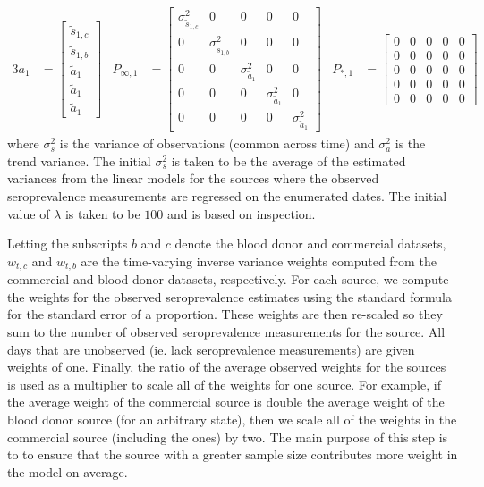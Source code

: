 \documentclass{article}
\begin{document}
\begin{alignat*}{3}
a_1 &= \begin{bmatrix}
\tilde{s}_{1,c}\\ 
\tilde{s}_{1,b}\\ 
\tilde{a}_1\\ 
\tilde{a}_1 \\
\tilde{a}_1
\end{bmatrix} & 
P_{\infty, 1} &= \begin{bmatrix}
\sigma^2_{\tilde{s}_{1,c}} & 0 & 0 & 0 & 0\\ 
0 & \sigma^2_{\tilde{s}_{1,b}} & 0 & 0 & 0\\ 
0 & 0 & \sigma^2_{\tilde{a}_1} & 0 & 0\\ 
0 & 0 & 0 & \sigma^2_{\tilde{a}_1} & 0 \\ 
0 & 0 & 0 & 0 & \sigma^2_{\tilde{a}_1}
\end{bmatrix} &  
P_{*, 1} &= \begin{bmatrix}
0 & 0 & 0 & 0 & 0\\ 
0 & 0 & 0 & 0 & 0\\ 
0 & 0 & 0 & 0 & 0\\ 
0 & 0 & 0 & 0 & 0 \\ 
0 & 0 & 0 & 0 & 0
\end{bmatrix}
\end{alignat*}
where $\sigma^2_s$ is the variance of observations (common across time) and $\sigma^2_a$ is the trend variance. The initial $\sigma^2_s$ is taken to be the average of the estimated variances from the linear models for the sources where the observed seroprevalence measurements are regressed on the enumerated dates. The initial value of $\lambda$ is taken to be $100$ and is based on inspection. 

Letting the subscripts $b$ and $c$ denote the blood donor and commercial datasets, $w_{t,c}$ and $w_{t,b}$ are the time-varying inverse variance weights computed from the commercial and blood donor datasets, respectively. For each source, we compute the weights for the observed seroprevalence estimates using the standard formula for the standard error of a proportion. These weights are then re-scaled so they sum to the number of observed seroprevalence measurements for the source. All days that are unobserved (ie. lack seroprevalence measurements) are given weights of one. Finally, the ratio of the average observed weights for the sources is used as a multiplier to scale all of the weights for one source. For example, if the average weight of the commercial source is double the average weight of the blood donor source (for an arbitrary state), then we scale all of the weights in the commercial source (including the ones) by two. The main purpose of this step is to to ensure that the source with a greater sample size contributes more weight in the model on average. %
\end{document}

